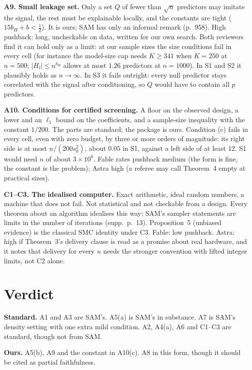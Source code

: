 \documentclass[11pt]{article}
\newcommand{\sz}{s_0}
\begin{document}
\textbf{A9. Small leakage set.} Only a set $Q$ of fewer than $\sqrt n$ predictors may imitate the signal, the rest must
be explainable locally, and the constants are tight ($15b_H+b<\tfrac12$). It is ours; SAM has only an informal remark
(p.~958). High pushback: long, uncheckable on data, written for our own search. Both reviewers find it can hold only as
a limit: at our sample sizes the size conditions fail in every cell (for instance the model-size cap needs $K\ge341$ when
$K=250$ at $n=500$; $|H_l|\le n^{b_H}$ allows at most $1.26$ predictors at $n=1000$). In S1 and S2 it plausibly holds as
$n\to\infty$. In S3 it fails outright: every null predictor stays correlated with the signal after conditioning, so $Q$
would have to contain all $p$ predictors.

\textbf{A10. Conditions for certified screening.} A floor on the observed design, a lower and an $\ell_1$ bound on the
coefficients, and a sample-size inequality with the constant $1/200$. The parts are standard; the package is ours.
Condition (c) fails in every cell, even with zero budget, by three or more orders of magnitude: its right side is at
most $n/(200\sz^2)$, about $0.05$ in S1, against a left side of at least $12$. S1 would need $n$ of about $3\times10^6$.
Fable rates pushback medium (the form is fine, the constant is the problem); Astra high (a referee may call Theorem~4
empty at practical sizes).

\textbf{C1--C3. The idealised computer.} Exact arithmetic, ideal random numbers, a machine that does not fail. Not
statistical and not checkable from a design. Every theorem about an algorithm idealises this way; SAM's sampler
statements are limits in the number of iterations (supp.~p.~13). Proposition~5 (unbiased evidence) is the classical SMC
identity under C3. Fable: low pushback. Astra: high if Theorem~3's delivery clause is read as a promise about real
hardware, and it notes that delivery for every $n$ needs the stronger convention with lifted integer limits, not C2
alone.

\section*{Verdict}
\textbf{Standard.} A1 and A3 are SAM's. A5(a) is SAM's in substance. A7 is SAM's density setting with one extra mild
condition. A2, A4(a), A6 and C1--C3 are standard, though not from SAM.

\textbf{Ours.} A5(b), A9 and the constant in A10(c). A8 in this form, though it should be cited as partial
faithfulness.
\end{document}
